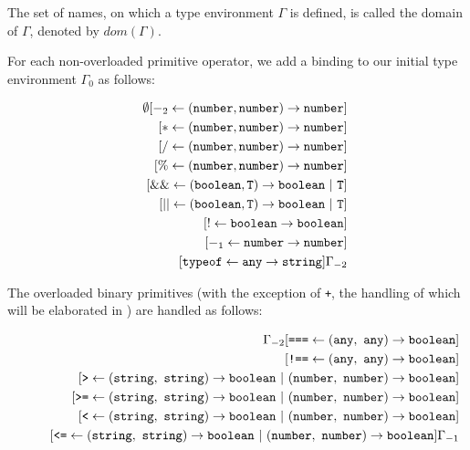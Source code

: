 The set of names, on which a type environment
$\Gamma$ is defined, is called the domain of $\Gamma$, 
denoted by $\textit{dom}(\Gamma)$.

For each non-overloaded primitive operator, we add a binding to our initial
type environment $\Gamma_0$ as follows:

\begin{eqnarray*}
& &
       \emptyset[ -_2 \leftarrow  (\texttt{number}, \texttt{number}) \rightarrow \texttt{number}]\\
&& \hspace{2mm} [ * \leftarrow  (\texttt{number}, \texttt{number}) \rightarrow \texttt{number}]\\
&& \hspace{2mm} [ / \leftarrow  (\texttt{number}, \texttt{number}) \rightarrow \texttt{number}]\\
&& \hspace{2mm} [ \% \leftarrow (\texttt{number}, \texttt{number}) \rightarrow \texttt{number}]\\
&& \hspace{2mm} [ \&\& \leftarrow (\texttt{boolean}, \texttt{T}) \rightarrow \texttt{boolean}\ |\ \texttt{T}]\\
&& \hspace{2mm} [ || \leftarrow   (\texttt{boolean}, \texttt{T}) \rightarrow \texttt{boolean}\ |\ \texttt{T}]\\
&& \hspace{2mm} [ ! \leftarrow \texttt{boolean} \rightarrow \texttt{boolean}]\\
&& \hspace{2mm} [ -_1 \leftarrow \texttt{number} \rightarrow \texttt{number}]\\
&& \hspace{2mm} [ \texttt{typeof} \leftarrow \texttt{any} \rightarrow \texttt{string}]\Gamma_{-2}
\end{eqnarray*}

The overloaded binary primitives (with the exception of \texttt{+}, the handling of which will be elaborated in )
are handled as follows:

\begin{eqnarray*}
 & &
      \Gamma_{-2}
                 [ \texttt{===} \leftarrow (\texttt{any},\ \texttt{any}) \rightarrow \texttt{boolean}] \\
&& \hspace{6mm}  [ \texttt{!==} \leftarrow (\texttt{any},\ \texttt{any}) \rightarrow \texttt{boolean}] \\
&& \hspace{6mm}  [ \texttt{>} \leftarrow (\texttt{string},\ \texttt{string}) \rightarrow \texttt{boolean}\ |\ (\texttt{number},\ \texttt{number}) \rightarrow \texttt{boolean}]\\
&& \hspace{6mm}  [ \texttt{>=} \leftarrow (\texttt{string},\ \texttt{string}) \rightarrow \texttt{boolean}\ |\ (\texttt{number},\ \texttt{number}) \rightarrow \texttt{boolean}]\\
&& \hspace{6mm}  [ \texttt{<} \leftarrow (\texttt{string},\ \texttt{string}) \rightarrow \texttt{boolean}\ |\ (\texttt{number},\ \texttt{number}) \rightarrow \texttt{boolean}] \\
&& \hspace{6mm}  [ \texttt{<=} \leftarrow (\texttt{string},\ \texttt{string}) \rightarrow \texttt{boolean}\ |\ (\texttt{number},\ \texttt{number}) \rightarrow \texttt{boolean}]\Gamma_{-1}
\end{eqnarray*}

